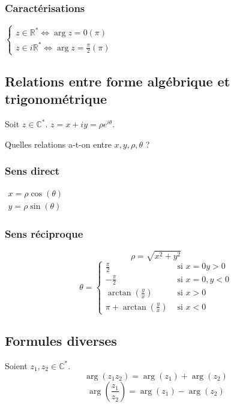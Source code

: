 \documentclass[12pt,a4paper,french]{book}
\begin{document}
			\subsubsection{Caractérisations}
			$\left\{\begin{array}{ll}
				z \in \mathbb{R}^\ast \Leftrightarrow \arg{z} = 0 (\pi)\\
				z \in i\mathbb{R}^\ast \Leftrightarrow \arg{z} = \frac{\pi}{2} (\pi)
			\end{array}\right.$
		\subsection{Relations entre forme algébrique et trigonométrique}
		Soit $z \in \mathbb{C}^\ast$. $z = x + iy = \rho e^{i\theta}$.
		
		Quelles relations a-t-on entre $x,y,\rho,\theta$ ?
			\subsubsection{Sens direct}
			$\begin{array}{ll}
				x = \rho \cos(\theta) \\
				y = \rho \sin(\theta)
			\end{array}$
			\subsubsection{Sens réciproque}
			\begin{equation*}
				\rho = \sqrt{x^2 + y^2}
			\end{equation*}
			\begin{equation*}
				\theta = \left\{ \begin{array}{ll}
					\frac{\pi}{2} &\mbox{ si } x = 0 y > 0\\
					-\frac{\pi}{2} &\mbox{ si } x = 0, y < 0\\
					\arctan\left(\frac{y}{x}\right) &\mbox{ si } x > 0\\
					\pi + \arctan\left(\frac{y}{x}\right) &\mbox{ si } x < 0
				\end{array}\right.
			\end{equation*}
		\subsection{Formules diverses}
		Soient $z_1,z_2 \in \mathbb{C}^\ast$.
		\[\operatorname{arg}(z_1 z_2) = \operatorname{arg}(z_1)+\operatorname{arg}(z_2)\]
		\[\operatorname{arg}\left(\frac{z_1}{z_2}\right) = \operatorname{arg}(z_1)-\operatorname{arg}(z_2)\]
\end{document}
